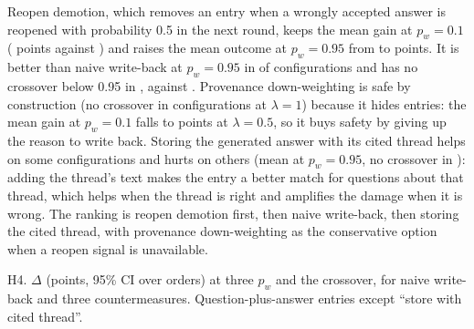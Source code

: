 \documentclass[11pt]{article}
\begin{document}
Reopen demotion, which removes an entry when a wrongly accepted answer is reopened with probability 0.5 in the next round, keeps the mean gain at $p_w=0.1$ (\gainReopenLow{} points against \gainNaiveLow{}) and raises the mean outcome at $p_w=0.95$ from \gainNaiveHigh{} to \gainReopenHigh{} points. It is better than naive write-back at $p_w=0.95$ in \nReopenBetter{} of \nConfigs{} configurations and has no crossover below 0.95 in \nReopenSafe{}, against \nNaiveSafe{}. Provenance down-weighting is safe by construction (no crossover in \nProvSafe{} configurations at $\lambda=1$) because it hides entries: the mean gain at $p_w=0.1$ falls to \gainProvLow{} points at $\lambda=0.5$, so it buys safety by giving up the reason to write back. Storing the generated answer with its cited thread helps on some configurations and hurts on others (mean \gainCiteHigh{} at $p_w=0.95$, no crossover in \nCiteSafe{}): adding the thread's text makes the entry a better match for questions about that thread, which helps when the thread is right and amplifies the damage when it is wrong. The ranking is reopen demotion first, then naive write-back, then storing the cited thread, with provenance down-weighting as the conservative option when a reopen signal is unavailable.

\begin{table}[t]\centering\small
\caption{H4. $\Delta$ (points, 95\% CI over orders) at three $p_w$ and the crossover, for naive write-back and three countermeasures. Question-plus-answer entries except ``store with cited thread''.}\label{tab:h4}
\begin{adjustbox}{max width=\linewidth, max totalheight=0.85\textheight}\end{adjustbox}
\end{table}
\end{document}
